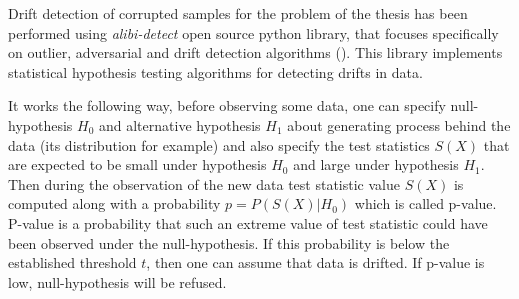 Drift detection of corrupted samples for the problem of the thesis has been performed using \textit{alibi-detect} open source python library, that focuses specifically on outlier, adversarial and drift detection algorithms (\cite{alibi-detect}). This library implements statistical hypothesis testing algorithms for detecting drifts in data. 

It works the following way, before observing some data, one can specify null-hypothesis $H_0$ and alternative hypothesis $H_1$ about generating process behind the data (its distribution for example) and also specify the test statistics $S(X)$ that are expected to be small under hypothesis $H_0$ and large under hypothesis $H_1$. Then during the observation of the new data test statistic value $S(X)$ is computed along with a probability $p = P(S(X)|H_0)$ which is called p-value. P-value is a probability that such an extreme value of test statistic could have been observed under the null-hypothesis. If this probability is below the established threshold $t$, then one can assume that data is drifted. If p-value is low, null-hypothesis will be refused. 

